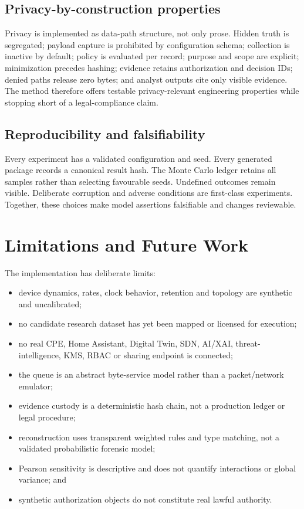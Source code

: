 ﻿\documentclass[11pt,a4paper]{article}
\begin{document}
\subsection{Privacy-by-construction properties}

Privacy is implemented as data-path structure, not only prose. Hidden truth is segregated; payload capture is prohibited by configuration schema; collection is inactive by default; policy is evaluated per record; purpose and scope are explicit; minimization precedes hashing; evidence retains authorization and decision IDs; denied paths release zero bytes; and analyst outputs cite only visible evidence. The method therefore offers testable privacy-relevant engineering properties while stopping short of a legal-compliance claim.

\subsection{Reproducibility and falsifiability}

Every experiment has a validated configuration and seed. Every generated package records a canonical result hash. The Monte Carlo ledger retains all samples rather than selecting favourable seeds. Undefined outcomes remain visible. Deliberate corruption and adverse conditions are first-class experiments. Together, these choices make model assertions falsifiable and changes reviewable.

\section{Limitations and Future Work}

The implementation has deliberate limits:

\begin{itemize}
  \item device dynamics, rates, clock behavior, retention and topology are synthetic and uncalibrated;
  \item no candidate research dataset has yet been mapped or licensed for execution;
  \item no real CPE, Home Assistant, Digital Twin, SDN, AI/XAI, threat-intelligence, KMS, RBAC or sharing endpoint is connected;
  \item the queue is an abstract byte-service model rather than a packet/network emulator;
  \item evidence custody is a deterministic hash chain, not a production ledger or legal procedure;
  \item reconstruction uses transparent weighted rules and type matching, not a validated probabilistic forensic model;
  \item Pearson sensitivity is descriptive and does not quantify interactions or global variance; and
  \item synthetic authorization objects do not constitute real lawful authority.
\end{itemize}
\end{document}
